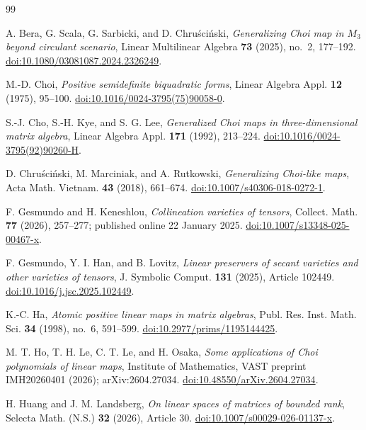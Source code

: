 \documentclass[11pt]{amsart}
\theoremstyle{plain}
\theoremstyle{definition}
\theoremstyle{remark}
\begin{document}
\begin{thebibliography}{99}

A. Bera, G. Scala, G. Sarbicki, and D. Chru\'sci\'nski,
\emph{Generalizing Choi map in $M_3$ beyond circulant scenario},
Linear Multilinear Algebra \textbf{73} (2025), no.~2, 177--192.
\href{https://doi.org/10.1080/03081087.2024.2326249}{doi:10.1080/03081087.2024.2326249}.

M.-D. Choi,
\emph{Positive semidefinite biquadratic forms},
Linear Algebra Appl. \textbf{12} (1975), 95--100.
\href{https://doi.org/10.1016/0024-3795(75)90058-0}{doi:10.1016/0024-3795(75)90058-0}.

S.-J. Cho, S.-H. Kye, and S. G. Lee,
\emph{Generalized Choi maps in three-dimensional matrix algebra},
Linear Algebra Appl. \textbf{171} (1992), 213--224.
\href{https://doi.org/10.1016/0024-3795(92)90260-H}{doi:10.1016/0024-3795(92)90260-H}.

D. Chru\'sci\'nski, M. Marciniak, and A. Rutkowski,
\emph{Generalizing Choi-like maps},
Acta Math. Vietnam. \textbf{43} (2018), 661--674.
\href{https://doi.org/10.1007/s40306-018-0272-1}{doi:10.1007/s40306-018-0272-1}.

F. Gesmundo and H. Keneshlou,
\emph{Collineation varieties of tensors},
Collect. Math. \textbf{77} (2026), 257--277; published online 22 January 2025.
\href{https://doi.org/10.1007/s13348-025-00467-x}{doi:10.1007/s13348-025-00467-x}.

F. Gesmundo, Y. I. Han, and B. Lovitz,
\emph{Linear preservers of secant varieties and other varieties of tensors},
J. Symbolic Comput. \textbf{131} (2025), Article 102449.
\href{https://doi.org/10.1016/j.jsc.2025.102449}{doi:10.1016/j.jsc.2025.102449}.

K.-C. Ha,
\emph{Atomic positive linear maps in matrix algebras},
Publ. Res. Inst. Math. Sci. \textbf{34} (1998), no.~6, 591--599.
\href{https://doi.org/10.2977/prims/1195144425}{doi:10.2977/prims/1195144425}.

M. T. Ho, T. H. Le, C. T. Le, and H. Osaka,
\emph{Some applications of Choi polynomials of linear maps},
Institute of Mathematics, VAST preprint IMH20260401 (2026); arXiv:2604.27034.
\href{https://doi.org/10.48550/arXiv.2604.27034}{doi:10.48550/arXiv.2604.27034}.

H. Huang and J. M. Landsberg,
\emph{On linear spaces of matrices of bounded rank},
Selecta Math. (N.S.) \textbf{32} (2026), Article 30.
\href{https://doi.org/10.1007/s00029-026-01137-x}{doi:10.1007/s00029-026-01137-x}.


\end{thebibliography}
\end{document}
